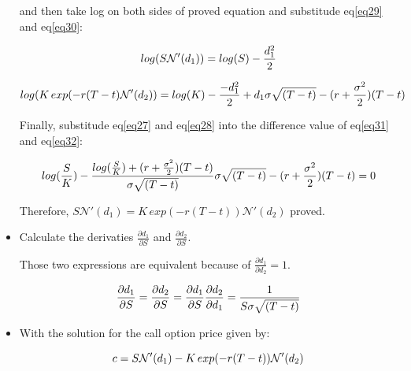\documentclass[sigconf]{acmart}
\begin{document}
\begin{itemize}
and then take log on both sides of proved equation and substitude eq\eqref{eq29} and eq\eqref{eq30}:

\begin{equation} \label{eq31}
\setlength{\abovedisplayskip}{3pt}
\setlength{\belowdisplayskip}{9pt}
log(S\mathcal{N'}(d_{1})) = log(S) - \frac{d_{1}^{2}}{2}
\end{equation}

\begin{equation} \label{eq32}
\setlength{\abovedisplayskip}{3pt}
\setlength{\belowdisplayskip}{9pt}
log(K\, exp(-r(T-t)\mathcal{N'}(d_{2})) = log(K)-\frac{-d_{1}^{2}}{2} + d_{1}\sigma \sqrt{(T-t)} -(r+\frac{\sigma^{2}}{2})(T-t)
\end{equation}

Finally, substitude eq\eqref{eq27} and eq\eqref{eq28} into the difference value of eq\eqref{eq31} and eq\eqref{eq32}:

\begin{equation} \label{eq33}
\setlength{\abovedisplayskip}{3pt}
\setlength{\belowdisplayskip}{9pt}
log(\frac{S}{K})-\frac{log(\frac{S}{K})+(r+\frac{\sigma^{2}}{2})(T-t)}{\sigma \sqrt{(T-t)}} \sigma \sqrt{(T-t)} - (r+\frac{\sigma^{2}}{2})(T-t) = 0
\end{equation}

Therefore, $S\mathcal{N'}(d_{1})=K\,exp(-r(T-t))\mathcal{N'}(d_{2})$ proved. ~\\

\item
Calculate the derivaties $\frac{\partial{d_{1}}}{\partial{S}}$ and $\frac{\partial{d_{2}}}{\partial{S}}$.

Those two expressions are equivalent because of $\frac{\partial{d_{1}}}{\partial{d_{2}}}=1$.

\begin{equation} \label{eq34}
\setlength{\abovedisplayskip}{3pt}
\setlength{\belowdisplayskip}{9pt}
\frac{\partial{d_{1}}}{\partial{S}} = \frac{\partial{d_{2}}}{\partial{S}} = \frac{\partial{d_{1}}}{\partial{S}} \frac{\partial{d_{2}}}{\partial{d_{1}}} = \frac{1}{S\sigma \sqrt{(T-t)}} ~\\
\end{equation}

\item

With the solution for the call option price given by:

\begin{equation} \label{eq35}
\setlength{\abovedisplayskip}{3pt}
\setlength{\belowdisplayskip}{9pt}
c = S\mathcal{N'}(d_{1})-K\,exp(-r(T-t))\mathcal{N'}(d_{2})
\end{equation}


\end{itemize}
\end{document}
